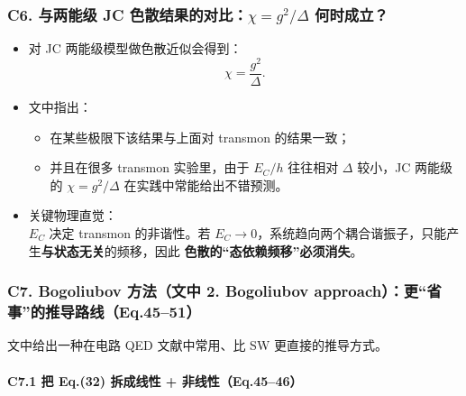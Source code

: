 \documentclass[12pt,a4paper,oneside]{ctexbook}
\providecommand{\tightlist}{%
  \setlength{\itemsep}{0pt}\setlength{\parskip}{0pt}}
\let\oldparagraph\paragraph
\renewcommand{\paragraph}[1]{\oldparagraph{#1}\mbox{}}
\begin{document}
\subsubsection{\texorpdfstring{\textbf{C6. 与两能级 JC
色散结果的对比：\(\chi=g^2/\Delta\)
何时成立？}}{C6. 与两能级 JC 色散结果的对比：\textbackslash{}chi=g\^{}2/\textbackslash{}Delta 何时成立？}}\label{c6.-ux4e0eux4e24ux80fdux7ea7-jc-ux8272ux6563ux7ed3ux679cux7684ux5bf9ux6bd4chig2delta-ux4f55ux65f6ux6210ux7acb}

\begin{itemize}
\tightlist
\item
  对 JC 两能级模型做色散近似会得到： \[
  \chi=\frac{g^2}{\Delta}.
  \]
\item
  文中指出：

  \begin{itemize}
  \tightlist
  \item
    在某些极限下该结果与上面对 transmon 的结果一致；
  \item
    并且在很多 transmon 实验里，由于 \(E_C/h\) 往往相对 \(\Delta\)
    较小，JC 两能级的 \(\chi=g^2/\Delta\) 在实践中常能给出不错预测。
  \end{itemize}
\item
  关键物理直觉：\\
  \textbf{\(E_C\)} 决定 transmon 的非谐性。若
  \(E_C\to 0\)，系统趋向两个耦合谐振子，只能产生\textbf{与状态无关}的频移，因此
  \textbf{色散的``态依赖频移''必须消失}。
\end{itemize}


\subsubsection{\texorpdfstring{\textbf{C7. Bogoliubov 方法（文中 2.
Bogoliubov
approach）：更``省事''的推导路线（Eq.45--51）}}{C7. Bogoliubov 方法（文中 2. Bogoliubov approach）：更``省事''的推导路线（Eq.45--51）}}\label{c7.-bogoliubov-ux65b9ux6cd5ux6587ux4e2d-2.-bogoliubov-approachux66f4ux7701ux4e8bux7684ux63a8ux5bfcux8defux7ebfeq.4551}

文中给出一种在电路 QED 文献中常用、比 SW 更直接的推导方式。

\paragraph{\texorpdfstring{\textbf{C7.1 把 Eq.(32) 拆成线性 +
非线性（Eq.45--46）}}{C7.1 把 Eq.(32) 拆成线性 + 非线性（Eq.45--46）}}\label{c7.1-ux628a-eq.32-ux62c6ux6210ux7ebfux6027-ux975eux7ebfux6027eq.4546}
\end{document}
